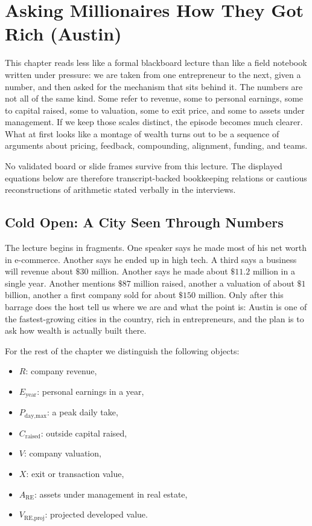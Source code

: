 \chapter{Asking Millionaires How They Got Rich (Austin)}

This chapter reads less like a formal blackboard lecture than like a field notebook written under pressure: we are taken from one entrepreneur to the next, given a number, and then asked for the mechanism that sits behind it. The numbers are not all of the same kind. Some refer to revenue, some to personal earnings, some to capital raised, some to valuation, some to exit price, and some to assets under management. If we keep those scales distinct, the episode becomes much clearer. What at first looks like a montage of wealth turns out to be a sequence of arguments about pricing, feedback, compounding, alignment, funding, and teams.

\begin{remark}
No validated board or slide frames survive from this lecture. The displayed equations below are therefore transcript-backed bookkeeping relations or cautious reconstructions of arithmetic stated verbally in the interviews.
\end{remark}

\section{Cold Open: A City Seen Through Numbers}

The lecture begins in fragments. One speaker says he made most of his net worth in e-commerce. Another says he ended up in high tech. A third says a business will revenue about $\$30$ million. Another says he made about $\$11.2$ million in a single year. Another mentions $\$87$ million raised, another a valuation of about $\$1$ billion, another a first company sold for about $\$150$ million. Only after this barrage does the host tell us where we are and what the point is: Austin is one of the fastest-growing cities in the country, rich in entrepreneurs, and the plan is to ask how wealth is actually built there.

\begin{definition}
For the rest of the chapter we distinguish the following objects:
\begin{itemize}
\item \(R\): company revenue,
\item \(E_{\text{year}}\): personal earnings in a year,
\item \(P_{\text{day,max}}\): a peak daily take,
\item \(C_{\text{raised}}\): outside capital raised,
\item \(V\): company valuation,
\item \(X\): exit or transaction value,
\item \(A_{\text{RE}}\): assets under management in real estate,
\item \(V_{\text{RE,proj}}\): projected developed value.
\end{itemize}
\end{definition}

